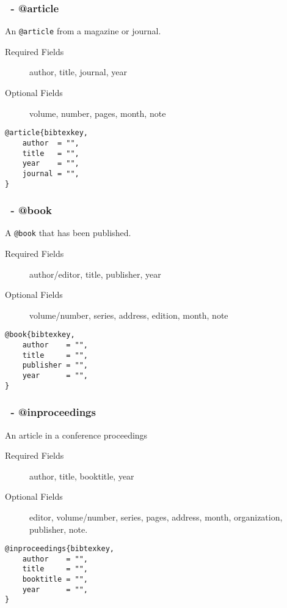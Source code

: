 \documentclass[mathserif]{beamer}
\begin{document}
\begin{frame}[fragile]
\frametitle{\BibTeX\ - @article}
\vfill
An \texttt{@article} from a magazine or journal.
\vfill
\begin{description}
	\item[Required Fields] author, title, journal, year
	\item[Optional Fields] volume, number, pages, month, note
\end{description}
\vfill
\begin{lstlisting}[style=latexsty]
@article{bibtexkey,
    author  = "",
    title   = "",
    year    = "",
    journal = "",
}
\end{lstlisting}
\vfill
\end{frame}


\begin{frame}[fragile]
\frametitle{\BibTeX\ - @book}
\vfill
A \texttt{@book} that has been published.
\vfill
\begin{description}
	\item[Required Fields] author/editor, title, publisher, year
	\item[Optional Fields] volume/number, series, address, edition, month, note
\end{description}
\vfill
\begin{lstlisting}[style=latexsty]
@book{bibtexkey,
    author    = "",
    title     = "",
    publisher = "",
    year      = "",
}
\end{lstlisting}
\vfill
\end{frame}

\begin{frame}[fragile]
\frametitle{\BibTeX\ - @inproceedings}
\vfill
An article in a conference proceedings
\vfill
\begin{description}
	\item[Required Fields] author, title, booktitle, year
	\item[Optional Fields] editor, volume/number, series, pages, address, month, organization, publisher, note.
	\end{description}
\vfill
\begin{lstlisting}[style=latexsty]
@inproceedings{bibtexkey,
    author    = "",
    title     = "",
    booktitle = "",
    year      = "",
}
\end{lstlisting}
\vfill
\end{frame}
\end{document}

